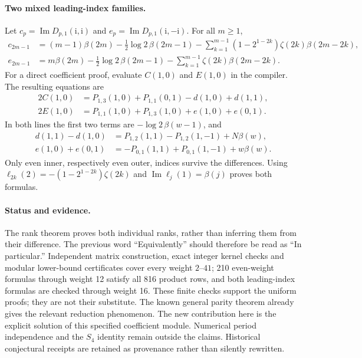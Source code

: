 \paragraph{Two mixed leading-index families.}
Let $c_p=\operatorname{Im}D_{p,1}(\mathrm i,\mathrm i)$ and
$e_p=\operatorname{Im}D_{p,1}(\mathrm i,-\mathrm i)$. For all $m\ge1$,
\begin{align}
 c_{2m-1}&=(m-1)\beta(2m)-\tfrac12\log2\,\beta(2m-1)
 -\sum_{k=1}^{m-1}(1-2^{1-2k})\zeta(2k)\beta(2m-2k),
 \label{l4rank:eq:c-family}\\
 e_{2m-1}&=m\beta(2m)-\tfrac12\log2\,\beta(2m-1)
 -\sum_{k=1}^{m-1}\zeta(2k)\beta(2m-2k).
 \label{l4rank:eq:e-family}
\end{align}
For a direct coefficient proof, evaluate $C(1,0)$ and $E(1,0)$ in the compiler.
The resulting equations are
\begin{align*}
 2C(1,0)&=P_{1,3}(1,0)+P_{1,1}(0,1)-d(1,0)+d(1,1),\\
 2E(1,0)&=P_{1,1}(1,0)+P_{1,3}(1,0)+e(1,0)+e(0,1).
\end{align*}
In both lines the first two terms are $-\log2\,\beta(w-1)$, and
\begin{align*}
 d(1,1)-d(1,0)&=P_{1,2}(1,1)-P_{1,2}(1,-1)+N\beta(w),\\
 e(1,0)+e(0,1)&=-P_{0,1}(1,1)+P_{0,1}(1,-1)+w\beta(w).
\end{align*}
Only even inner, respectively even outer, indices survive the differences.
Using $\ell_{2k}(2)=-(1-2^{1-2k})\zeta(2k)$ and
$\operatorname{Im}\ell_j(1)=\beta(j)$ proves both formulas.

\paragraph{Status and evidence.}
The rank theorem proves both individual ranks, rather than inferring them
from their difference. The previous word ``Equivalently'' should therefore
be read as ``In particular.'' Independent matrix construction, exact integer
kernel checks and modular lower-bound certificates cover every weight
$2$--$41$; 210 even-weight formulas through weight 12 satisfy all 816 product
rows, and both leading-index formulas are checked through weight 16.
These finite checks support the uniform proofs; they are not their substitute.
The known general parity theorem already gives the relevant reduction
phenomenon. The new contribution here is the explicit solution of this
specified coefficient module. Numerical period independence and the $S_4$
identity remain outside the claims. Historical conjectural receipts are
retained as provenance rather than silently rewritten.
